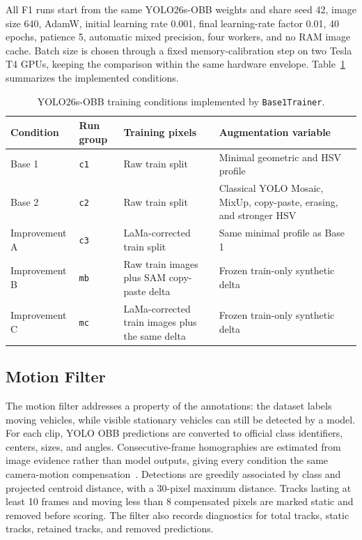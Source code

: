 All F1 runs start from the same YOLO26s-OBB weights and share seed 42, image size 640, AdamW, initial learning rate 0.001, final learning-rate factor 0.01, 40 epochs, patience 5, automatic mixed precision, four workers, and no RAM image cache. Batch size is chosen through a fixed memory-calibration step on two Tesla T4 GPUs, keeping the comparison within the same hardware envelope. Table~\ref{tab:training_conditions} summarizes the implemented conditions.

\begin{table}[!t]
  \caption{YOLO26s-OBB training conditions implemented by \texttt{Base1Trainer}.}
  \label{tab:training_conditions}
  \centering
  \small
  \begin{tabular}{p{} p{} p{} p{}}
    \toprule
    \textbf{Condition} & \textbf{Run group} & \textbf{Training pixels} & \textbf{Augmentation variable} \\
    \midrule
    Base 1 & \texttt{c1} & Raw train split & Minimal geometric and HSV profile \\
    Base 2 & \texttt{c2} & Raw train split & Classical YOLO Mosaic, MixUp, copy-paste, erasing, and stronger HSV \\
    Improvement A & \texttt{c3} & LaMa-corrected train split & Same minimal profile as Base 1 \\
    Improvement B & \texttt{mb} & Raw train images plus SAM copy-paste delta & Frozen train-only synthetic delta \\
    Improvement C & \texttt{mc} & LaMa-corrected train images plus the same delta & Frozen train-only synthetic delta \\
    \bottomrule
  \end{tabular}
\end{table}

\subsection{Motion Filter}
\label{sec:motion_filter}

The motion filter addresses a property of the annotations: the dataset labels moving vehicles, while visible stationary vehicles can still be detected by a model. For each clip, YOLO OBB predictions are converted to official class identifiers, centers, sizes, and angles. Consecutive-frame homographies are estimated from image evidence rather than model outputs, giving every condition the same camera-motion compensation~\cite{Hartley2004MVG}. Detections are greedily associated by class and projected centroid distance, with a 30-pixel maximum distance. Tracks lasting at least 10 frames and moving less than 8 compensated pixels are marked static and removed before scoring. The filter also records diagnostics for total tracks, static tracks, retained tracks, and removed predictions.

